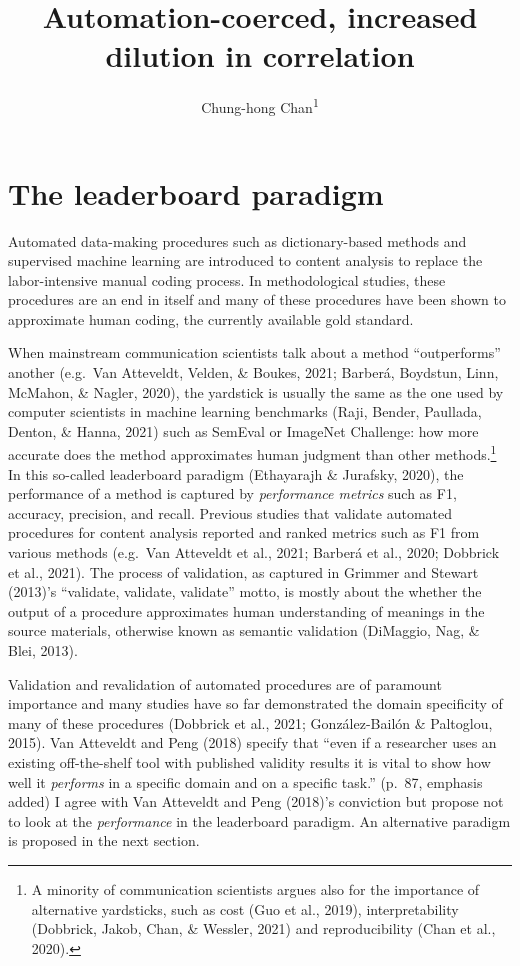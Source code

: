 \documentclass[english,man,floatsintext]{apa6}
\title{Automation-coerced, increased dilution in correlation}
\author{Chung-hong Chan\textsuperscript{1}}
\date{}
\affiliation{\vspace{0.5cm}\textsuperscript{1} Mannheimer Zentrum für Europäische Sozialforschung, Universität Mannheim, Germany}
\begin{document}
\maketitle

\hypertarget{the-leaderboard-paradigm}{%
\section{The leaderboard paradigm}\label{the-leaderboard-paradigm}}

Automated data-making procedures such as dictionary-based methods and supervised machine learning are introduced to content analysis to replace the labor-intensive manual coding process. In methodological studies, these procedures are an end in itself and many of these procedures have been shown to approximate human coding, the currently available gold standard.

When mainstream communication scientists talk about a method \enquote{outperforms} another (e.g.~Van Atteveldt, Velden, \& Boukes, 2021; Barberá, Boydstun, Linn, McMahon, \& Nagler, 2020), the yardstick is usually the same as the one used by computer scientists in machine learning benchmarks (Raji, Bender, Paullada, Denton, \& Hanna, 2021) such as SemEval or ImageNet Challenge: how more accurate does the method approximates human judgment than other methods.\footnote{A minority of communication scientists argues also for the importance of alternative yardsticks, such as cost (Guo et al., 2019), interpretability (Dobbrick, Jakob, Chan, \& Wessler, 2021) and reproducibility (Chan et al., 2020).} In this so-called leaderboard paradigm (Ethayarajh \& Jurafsky, 2020), the performance of a method is captured by \emph{performance metrics} such as F1, accuracy, precision, and recall. Previous studies that validate automated procedures for content analysis reported and ranked metrics such as F1 from various methods (e.g.~Van Atteveldt et al., 2021; Barberá et al., 2020; Dobbrick et al., 2021). The process of validation, as captured in Grimmer and Stewart (2013)'s \enquote{validate, validate, validate} motto, is mostly about the whether the output of a procedure approximates human understanding of meanings in the source materials, otherwise known as semantic validation (DiMaggio, Nag, \& Blei, 2013).

Validation and revalidation of automated procedures are of paramount importance and many studies have so far demonstrated the domain specificity of many of these procedures (Dobbrick et al., 2021; González-Bailón \& Paltoglou, 2015). Van Atteveldt and Peng (2018) specify that \enquote{even if a researcher uses an existing off-the-shelf tool with published validity results it is vital to show how well it \emph{performs} in a specific domain and on a specific task.} (p.~87, emphasis added) I agree with Van Atteveldt and Peng (2018)'s conviction but propose not to look at the \emph{performance} in the leaderboard paradigm. An alternative paradigm is proposed in the next section.
\end{document}
